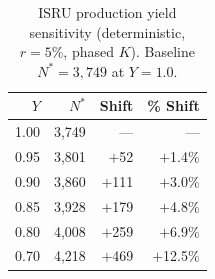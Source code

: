 \begin{table}[htbp]
\centering
\caption{ISRU production yield sensitivity (deterministic, $r = 5\%$, phased $K$). Baseline $N^* = 3{,}749$ at $Y = 1.0$.}
\label{tab:yield_sensitivity}
\small
\begin{tabular}{@{}rrrr@{}}
\toprule
$Y$ & $N^*$ & Shift & \% Shift \\
\midrule
1.00 & 3{,}749 & --- & --- \\
0.95 & 3{,}801 & $+$52  & $+$1.4\% \\
0.90 & 3{,}860 & $+$111 & $+$3.0\% \\
0.85 & 3{,}928 & $+$179 & $+$4.8\% \\
0.80 & 4{,}008 & $+$259 & $+$6.9\% \\
0.70 & 4{,}218 & $+$469 & $+$12.5\% \\
\bottomrule
\end{tabular}
\end{table}
